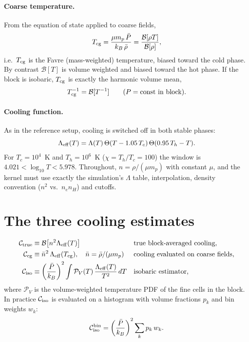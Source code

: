 \documentclass[11pt]{article}
\newcommand{\B}{\mathcal{B}}
\newcommand{\Leff}{\Lambda_{\rm eff}}
\newcommand{\Ctrue}{\mathcal{C}_{\rm true}}
\newcommand{\Ccg}{\mathcal{C}_{\rm cg}}
\newcommand{\Ciso}{\mathcal{C}_{\rm iso}}
\newcommand{\Cbin}{\mathcal{C}_{\rm iso}^{\rm bin}}
\newcommand{\Tcg}{T_{\rm cg}}
\begin{document}
\paragraph{Coarse temperature.} From the equation of state applied to coarse fields,
\begin{equation}
\Tcg = \frac{\mu m_p\,\bar P}{k_B\,\bar\rho} = \frac{\B[\rho T]}{\B[\rho]},
\end{equation}
i.e.\ $\Tcg$ is the Favre (mass-weighted) temperature, biased toward the cold phase. By contrast $\B[T]$ is volume weighted and biased toward the hot phase. If the block is isobaric, $\Tcg$ is exactly the harmonic volume mean,
\begin{equation}
\Tcg^{-1} = \B[T^{-1}] \qquad (P=\text{const in block}).
\label{eq:harmonic}
\end{equation}

\paragraph{Cooling function.} As in the reference setup, cooling is switched off in both stable phases:
\begin{equation}
\Leff(T)=\Lambda(T)\,\Theta(T-1.05\,T_c)\,\Theta(0.95\,T_h-T).
\end{equation}
For $T_c=10^4$~K and $T_h=10^6$~K ($\chi=T_h/T_c=100$) the window is $4.021<\log_{10}T<5.978$. Throughout, $n=\rho/(\mu m_p)$ with constant $\mu$, and the kernel must use exactly the simulation's $\Lambda$ table, interpolation, density convention ($n^2$ vs.\ $n_en_H$) and cutoffs.

\section{The three cooling estimates}

\begin{align}
\Ctrue &\equiv \B\!\left[n^2\Leff(T)\right] && \text{true block-averaged cooling,}\\
\Ccg   &\equiv \bar n^2\,\Leff(\Tcg),\quad \bar n=\bar\rho/(\mu m_p) && \text{cooling evaluated on coarse fields,}\\
\Ciso  &\equiv \left(\frac{\bar P}{k_B}\right)^{2}\int \mathcal{P}_V(T)\,\frac{\Leff(T)}{T^2}\,dT && \text{isobaric estimator,}
\end{align}
where $\mathcal{P}_V$ is the volume-weighted temperature PDF of the fine cells in the block. In practice $\Ciso$ is evaluated on a histogram with volume fractions $p_k$ and bin weights $w_k$:
\begin{equation}
\Cbin = \left(\frac{\bar P}{k_B}\right)^{2}\sum_k p_k\,w_k .
\end{equation}
\end{document}
